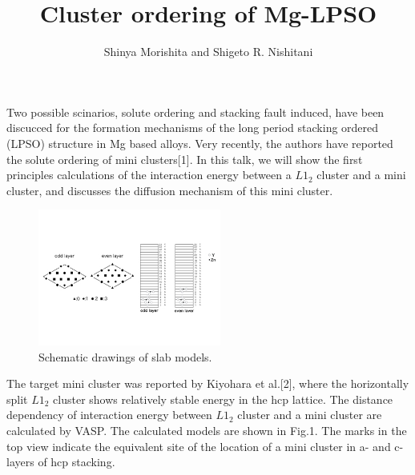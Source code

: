 \documentclass[12pt,a4j]{article}
\begin{document}
\title{Cluster ordering of Mg-LPSO}
\author{Shinya Morishita and Shigeto R. Nishitani}
\date{}
\maketitle
Two possible scinarios, solute ordering and stacking fault induced, have been discucced for the formation mechanisms of the long period stacking ordered (LPSO) structure in Mg based alloys.  Very recently, the authors have reported the solute ordering of mini clusters[1].  In this talk, we will show the first principles calculations of the interaction energy between a $L1_2$ cluster and a mini cluster, and discusses the diffusion mechanism of this mini cluster.

\begin{figure}
\vspace{-8\baselineskip}
\begin{center}
\includegraphics[width=6cm,bb=0 0 442 500]{../figs/./calphad_donkey.001.jpeg}
\caption{Schematic drawings of slab models.}
\end{center}
\vspace{0\baselineskip}
\end{figure}
The target mini cluster was reported by Kiyohara et al.[2], where the horizontally split $L1_2$ cluster shows relatively stable energy in the hcp lattice.  The distance dependency of interaction energy between $L1_2$ cluster and a mini cluster are calculated by VASP.  The calculated models are shown in Fig.1. The marks in the top view indicate the equivalent site of the location of a mini cluster in a- and c- layers of hcp stacking.  
\end{document}
